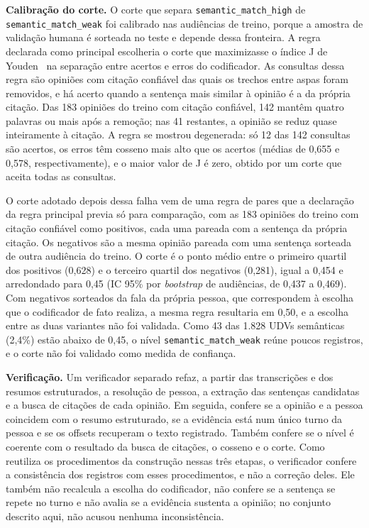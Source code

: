 \textbf{Calibração do corte.} O corte que separa \texttt{semantic\_match\_high} de
\texttt{semantic\_match\_weak} foi calibrado nas audiências de treino, porque a amostra de validação
humana é sorteada no teste e depende dessa fronteira. A regra declarada como principal escolheria o
corte que maximizasse o índice J de Youden~\citep{youden1950index} na separação entre acertos e erros
do codificador. As consultas dessa regra são opiniões com citação confiável das quais os trechos entre
aspas foram removidos, e há acerto quando a sentença mais similar à opinião é a da própria citação.
Das 183 opiniões do treino com citação confiável, 142 mantêm quatro palavras ou mais após a remoção;
nas 41 restantes, a opinião se reduz quase inteiramente à citação. A regra se mostrou degenerada: só
12 das 142 consultas são acertos, os erros têm cosseno mais alto que os acertos (médias de 0,655 e
0,578, respectivamente), e o maior valor de J é zero, obtido por um corte que aceita todas as
consultas.

O corte adotado depois dessa falha vem de uma regra de pares que a declaração da regra principal
previa só para comparação, com as 183 opiniões do treino com citação confiável como positivos, cada uma pareada com a
sentença da própria citação. Os negativos são a mesma opinião pareada com uma sentença sorteada de
outra audiência do treino. O corte é o ponto médio entre o primeiro quartil dos positivos (0,628) e
o terceiro quartil dos negativos (0,281), igual a 0,454 e arredondado para 0,45 (IC 95\% por
\textit{bootstrap} de audiências, de 0,437 a 0,469). Com negativos sorteados da fala da própria
pessoa, que correspondem à escolha que o codificador de fato realiza, a mesma regra resultaria em
0,50, e a escolha entre as duas variantes não foi validada. Como 43 das 1.828 UDVs semânticas (2,4\%)
estão abaixo de 0,45, o nível \texttt{semantic\_match\_weak} reúne poucos registros, e o corte não
foi validado como medida de confiança.

\textbf{Verificação.} Um verificador separado refaz, a partir das transcrições e dos resumos
estruturados, a resolução de pessoa, a extração das sentenças candidatas e a busca de citações de
cada opinião. Em seguida, confere se a opinião e a pessoa coincidem com o resumo estruturado, se a
evidência está num único turno da pessoa e se os offsets recuperam o texto registrado. Também confere
se o nível é coerente com o resultado da busca de citações, o cosseno e o corte. Como reutiliza os procedimentos da
construção nessas três etapas, o verificador confere a consistência dos registros com esses
procedimentos, e não a correção deles. Ele
também não recalcula a escolha do codificador, não confere se a sentença se repete no turno e não
avalia se a evidência sustenta a opinião; no conjunto descrito aqui, não acusou nenhuma
inconsistência.

